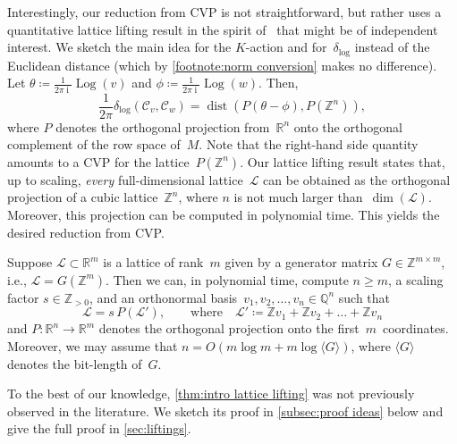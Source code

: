\documentclass[a4paper,USenglish,cleveref,numberwithinsect]{lipics-v2021}
\DeclareMathOperator{\ii}{i}
\DeclareMathOperator{\Log}{Log}
\DeclareMathOperator{\dist}{dist}
\newcommand{\distLD}{\delta_{\log}}
\newcommand{\QQ}{\mathbb{Q}}
\newcommand{\ZZ}{\mathbb{Z}}
\newcommand{\RR}{\mathbb{R}}
\newcommand{\KK}{\ensuremath{\mathcal{C}}}
\numberwithin{equation}{section}
\begin{document}
Interestingly, our reduction from CVP is not straightforward,
but rather uses a quantitative lattice lifting result
in the spirit of~\cite{conway-sloane} that might be of independent interest.
We sketch the main idea for the $K$-action and for~$\distLD$ instead of the Euclidean distance
(which by \cref{footnote:norm conversion} makes no difference).
Let $\theta \coloneqq \frac1{2\pi\ii} \Log(v)$ and $\phi\coloneqq \frac1{2\pi\ii} \Log(w)$.
Then,
\begin{equation}
\label{eq:distLD-to-CVP}
  \frac1{2\pi} \distLD(\KK_v, \KK_w)
 = \dist(P(\theta - \phi), P(\ZZ^n)),
\end{equation}
where $P$ denotes the orthogonal projection from~$\RR^n$ onto the orthogonal complement of the row space of~$M$.
Note that the right-hand side quantity amounts to a CVP for the lattice~$P(\ZZ^n)$.
Our lattice lifting result states that, up to scaling, \emph{every} full-dimensional lattice~$\mathcal L$
can be obtained as the orthogonal projection of a cubic lattice~$\ZZ^n$, where $n$ is not much larger than~$\dim(\mathcal L)$.
Moreover, this projection can be computed in polynomial time.
This yields the desired reduction from CVP.

\begin{theorem}\label{thm:intro lattice lifting}
Suppose $\mathcal{L} \subset \RR^m$ is a lattice of rank~$m$ given by a generator matrix $G\in\ZZ^{m\times m}$,
i.e., $\mathcal{L} = G(\ZZ^m)$.
Then we can, in polynomial time, compute $n\geq m$, a scaling factor $s\in\ZZ_{>0}$,
and an orthonormal basis~$v_1,v_2,\dots,v_n\in\QQ^n$ such that
\[
    \mathcal{L} = s\, P(\mathcal{L}'),\qquad \text{where}\quad \mathcal{L}'\coloneqq \ZZ v_1 +\ZZ v_2+\dots+\ZZ v_n
\]
and
$P \colon \RR^n\rightarrow\RR^m$ denotes the orthogonal projection onto the first~$m$~coordinates.
Moreover, we may assume that $n = O(m\log m + m \log\langle G\rangle)$,
where $\langle G\rangle$ denotes the bit-length of~$G$.
\end{theorem}

To the best of our knowledge, \cref{thm:intro lattice lifting} was not previously observed in the literature.
We sketch its proof in \cref{subsec:proof ideas} below and give the full proof in \cref{sec:liftings}.

\end{document}
